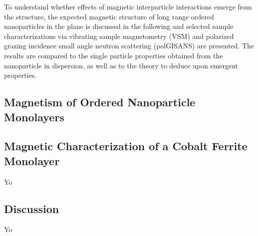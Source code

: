 \documentclass[\main/dresen_thesis.tex]{subfiles}
\renewcommand{\thisPath}{\main/chapters/monolayers/magneticStructure}
\begin{document}
  To understand whether effects of magnetic interparticle interactions emerge from the structure, the expected magnetic structure of long range ordered nanoparticles in the plane is discussed in the following and selected sample characterizations via vibrating sample magnetometry (VSM) and polarized grazing incidence small angle neutron scattering (polGISANS) are presented.
  The results are compared to the single particle properties obtained from the nanoparticle in dispersion, as well as to the theory to deduce upon emergent properties.

  \subsection{Magnetism of Ordered Nanoparticle Monolayers}
    
    \FloatBarrier

  \subsection{Magnetic Characterization of a Cobalt Ferrite Monolayer}
    Yo
    \FloatBarrier

  \subsection{Discussion}
    Yo
    \FloatBarrier
\end{document}
